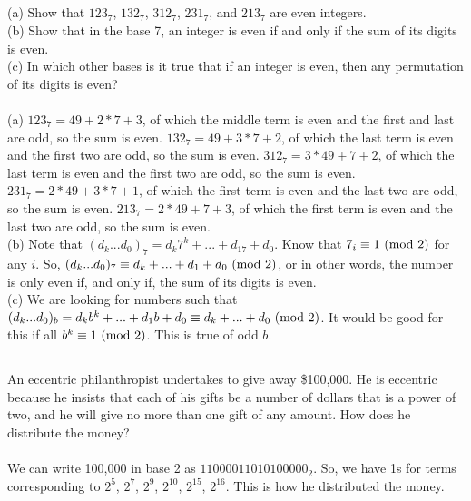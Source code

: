 \documentclass{article} \usepackage{amsmath}
\begin{document}
\subsection{}
(a) Show that $123_7$, $132_7$, $312_7$, $231_7$, and $213_7$ are even integers.\\
(b) Show that in the base 7, an integer is even if and only if the sum of its
digits is even.\\
(c) In which other bases is it true that if an integer is even, then any
permutation of its digits is even?\\~\\
(a) $123_7 = 49 + 2*7 + 3$, of which the middle term is even and the first and
last are odd, so the sum is even.
$132_7 = 49 + 3*7 + 2$, of which the last term is even and the first two
are odd, so the sum is even.
$312_7 = 3*49 + 7 + 2$, of which the last term is even and the first two
are odd, so the sum is even.
$231_7 = 2*49 + 3*7 + 1$, of which the first term is even and the last two
are odd, so the sum is even.
$213_7 = 2*49 + 7 + 3$, of which the first term is even and the last two
are odd, so the sum is even.\\
(b) Note that $(d_k...d_0)_7 = d_k7^k + ... + d_17 + d_0$.
Know that $7_i \equiv 1 \ (\mathrm{mod}\ 2)$ for any $i$.
So, $(d_k...d_0)_7 \equiv d_k + ... + d_1 + d_0 \ (\mathrm{mod}\ 2)$,
or in other words, the number is only even if, and only if,
the sum of its digits is even.\\
(c) We are looking for numbers such that
$(d_k...d_0)_b = d_kb^k + ... + d_1b + d_0 \equiv d_k + ... + d_0 \ (\mathrm{mod}\ 2)$.
It would be good for this if all $b^k \equiv 1 \ (\mathrm{mod}\ 2)$.
This is true of odd $b$.

\subsection{}
An eccentric philanthropist undertakes to give away \$100,000.
He is eccentric because he insists that each of his gifts be a number of dollars
that is a power of two, and he will give no more than one gift of any amount.
How does he distribute the money?\\~\\
We can write 100,000 in base 2 as $11000011010100000_2$.
So, we have 1s for terms corresponding to
$2^5$, $2^7$, $2^9$, $2^{10}$, $2^{15}$, $2^{16}$.
This is how he distributed the money.

\end{document}
